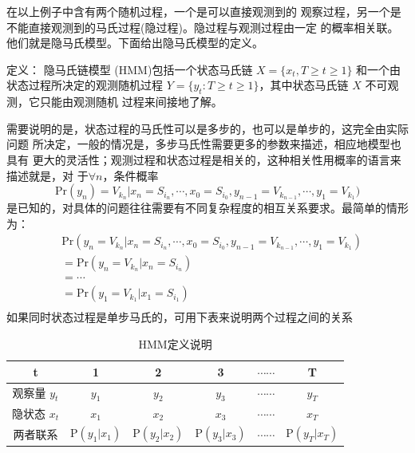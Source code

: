 在以上例子中含有两个随机过程，一个是可以直接观测到的
观察过程，另一个是不能直接观测到的马氏过程(隐过程)。隐过程与观测过程由一定
的概率相关联。他们就是隐马氏模型。下面给出隐马氏模型的定义。

定义： 隐马氏链模型 (HMM)包括一个状态马氏链
 $X=\{x_{t},T\geq t \geq 1\}$ 和一个由状态过程所决定的观测随机过程
 $Y=\{y_{t}:T\geq t\geq 1\}$，其中状态马氏链 $X$ 不可观测，它只能由观测随机
过程来间接地了解。

需要说明的是，状态过程的马氏性可以是多步的，也可以是单步的，这完全由实际问题
所决定，一般的情况是，多步马氏性需要更多的参数来描述，相应地模型也具有
更大的灵活性；观测过程和状态过程是相关的，这种相关性用概率的语言来描述就是，对
于$\forall n$，条件概率
$$
\mbox{Pr}(y_{n})=V_{k_{n}} | x_{n}=S_{i_{n}}, \cdots, x_{0}
      =S_{i_{0}}, y_{n-1}=V_{k_{n-1}}, \cdots, y_{1}=V_{k_{1}})
$$
是已知的，对具体的问题往往需要有不同复杂程度的相互关系要求。最简单的情形为：
$$
\begin{aligned}
&\mbox{Pr}(y_{n}=V_{k_{n}} | x_{n}=S_{i_{n}}, \cdots, x_{0}=S_{i_{0}}, y_{n-1}=V_{k_{n-1}}, \cdots, y_{1}=V_{k_{1}})\\
&=\mbox{Pr}(y_{n}=V_{k_{n}} | x_{n}=S_{i_{n}})\\
&=\cdots\\
&=\mbox{Pr}(y_{1}=V_{k_{1}} | x_{1}=S_{i_{1}})\\
\end{aligned}
$$
如果同时状态过程是单步马氏的，可用下表来说明两个过程之间的关系
\begin{table}
 \centering
   \begin{tabular}{|c|c|c|c|c|c|}
     \hline
       t & 1 & 2 & 3 & $\cdots\cdots$ & T \\
      \hline
        观察量 $y_{t}$ & $y_{1}$ & $y_{2}$ & $y_{3}$
                       & $\cdots\cdots$ & $y_{T}$ \\
      \hline
        隐状态 $x_{t}$ & $x_{1}$ & $x_{2}$ & $x_{3}$
                      & $\cdots\cdots$ & $x_{T}$ \\
      \hline
        两者联系 & P$(y_{1}| x_{1})$ &P$(y_{2}| x_{2})$ & P$(y_{3}| x_{3})$
              & $\cdots\cdots$ & P$(y_{T}| x_{T})$\\
      \hline
   \end{tabular}
   \caption{HMM定义说明}
\end{table}


